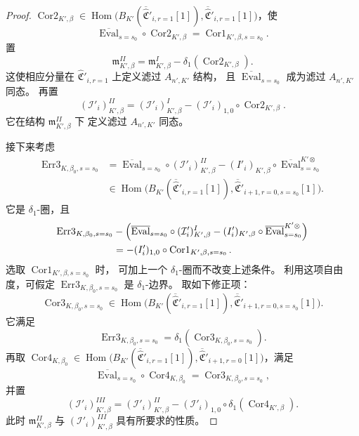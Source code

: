 \begin{proof}
$\operatorname{Cor2}_{K',\beta}\in
\operatorname{Hom}\bigl(
B_{K'}(\overline{\widehat{\mathfrak C}}'_{i,r=1}[1]),
\overline{\widehat{\mathfrak C}}'_{i,r=1}[1]
\bigr)$，使
\[
\overline{\operatorname{Eval}}_{s=s_0}\circ
\operatorname{Cor2}_{K',\beta}
=\operatorname{Cor1}_{K',\beta,s=s_0}.
\]
置
\[
\mathfrak m^{II}_{K',\beta}
=\mathfrak m^I_{K',\beta}
-\delta_1(\operatorname{Cor2}_{K',\beta}).
\]
这使相应分量在 $\widehat{\mathfrak C}'_{i,r=1}$
上定义滤过 $A_{n',K'}$ 结构，
且 $\overline{\operatorname{Eval}}_{s=s_0}$
成为滤过 $A_{n',K'}$ 同态。
再置
\[
(\mathcal I'_i)^{II}_{K',\beta}
=(\mathcal I'_i)^I_{K',\beta}
-(\mathcal I'_i)_{1,0}\circ
\operatorname{Cor2}_{K',\beta}.
\]
它在结构 $\mathfrak m^{II}_{K',\beta}$ 下
定义滤过 $A_{n',K'}$ 同态。

接下来考虑
\[
\begin{aligned}
\operatorname{Err3}_{K,\beta_0,s=s_0}
&=\overline{\operatorname{Eval}}_{s=s_0}\circ
(\mathcal I'_i)^{II}_{K',\beta}
-(I'_i)_{K',\beta}\circ
\overline{\operatorname{Eval}}_{s=s_0}^{K'\otimes}\\
&\in\operatorname{Hom}\bigl(
B_{K'}(\overline{\widehat{\mathfrak C}}'_{i,r=1}[1]),
\overline{\widehat{\mathfrak C}}'_{i+1,r=0,s=s_0}[1]
\bigr).
\end{aligned}
\]
它是 $\delta_1$-圈，且
\[
\begin{aligned}
\operatorname{Err3}_{K,\beta_0,s=s_0}
&-\Bigl(
\overline{\operatorname{Eval}}_{s=s_0}\circ
(\mathcal I'_i)^I_{K',\beta}
-(I'_i)_{K',\beta}\circ
\overline{\operatorname{Eval}}_{s=s_0}^{K'\otimes}
\Bigr)\\
&=-(I'_i)_{1,0}\circ
\operatorname{Cor1}_{K',\beta,s=s_0}.
\end{aligned}
\]
选取 $\operatorname{Cor1}_{K',\beta,s=s_0}$ 时，
可加上一个 $\delta_1$-圈而不改变上述条件。
利用这项自由度，可假定
$\operatorname{Err3}_{K,\beta_0,s=s_0}$
是 $\delta_1$-边界。
取如下修正项：
\[
\operatorname{Cor3}_{K,\beta_0,s=s_0}\in
\operatorname{Hom}\bigl(
B_{K'}(\overline{\widehat{\mathfrak C}}'_{i,r=1}[1]),
\overline{\widehat{\mathfrak C}}'_{i+1,r=0,s=s_0}[1]
\bigr).
\]
它满足
\[
\operatorname{Err3}_{K,\beta_0,s=s_0}
=\delta_1(\operatorname{Cor3}_{K,\beta_0,s=s_0}).
\]
再取
$\operatorname{Cor4}_{K,\beta_0}\in
\operatorname{Hom}\bigl(
B_{K'}(\overline{\widehat{\mathfrak C}}'_{i,r=1}[1]),
\overline{\widehat{\mathfrak C}}'_{i+1,r=0}[1]
\bigr)$，满足
\[
\overline{\operatorname{Eval}}_{s=s_0}\circ
\operatorname{Cor4}_{K,\beta_0}
=\operatorname{Cor3}_{K,\beta_0,s=s_0},
\]
并置
\[
(\mathcal I'_i)^{III}_{K',\beta}
=(\mathcal I'_i)^{II}_{K',\beta}
-(\mathcal I'_i)_{1,0}\circ
\delta_1(\operatorname{Cor4}_{K',\beta}).
\]
此时 $\mathfrak m^{II}_{K',\beta}$ 与
$(\mathcal I'_i)^{III}_{K',\beta}$
具有所要求的性质。
\end{proof}

